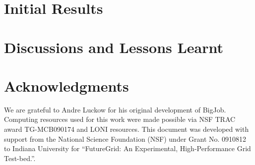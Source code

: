 \documentclass{sig-alternate}
\begin{document}
\section{Initial Results} 

\section{Discussions and Lessons Learnt}


\section{Acknowledgments}
We are grateful to Andre Luckow for his original development of
BigJob.  Computing resources used for this work were made possible via
NSF TRAC award TG-MCB090174 and LONI resources.  This document was
developed with support from the National Science Foundation (NSF)
under Grant No.  0910812 to Indiana University for ``FutureGrid: An
Experimental, High-Performance Grid Test-bed.''.



\end{document}
